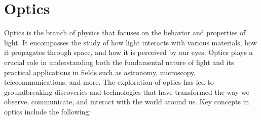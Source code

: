 \chapter{Optics}
\thispagestyle{fancy}

Optics is the branch of physics that focuses on the behavior and properties of light. It encompasses the study of how light interacts with various materials, how it propagates through space, and how it is perceived by our eyes. Optics plays a crucial role in understanding both the fundamental nature of light and its practical applications in fields such as astronomy, microscopy, telecommunications, and more. The exploration of optics has led to groundbreaking discoveries and technologies that have transformed the way we observe, communicate, and interact with the world around us. Key concepts in optics include the following:

